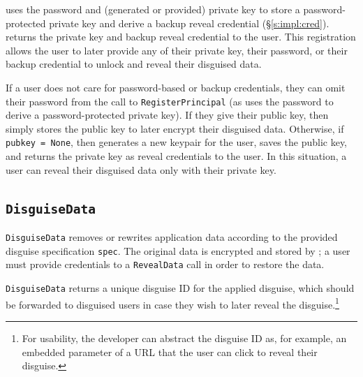     \sys uses the password and (generated or provided) private key to store a
    password-pro\-tected private key and derive a backup reveal credential
    (\S\ref{s:impl:cred}). \sys returns the private key and backup reveal
    credential to the user. This registration allows the user to later provide
    any of their private key, their password, or their backup credential to
    unlock and reveal their disguised data.

    If a user does not care for password-based or backup credentials, they can
    omit their password from the call to \texttt{RegisterPrincipal} (as \sys
    uses the password to derive a password-protected private key).  If they give
    \sys their public key, then \sys simply stores the public key to later
    encrypt their disguised data. Otherwise, if \texttt{pubkey = None}, then
    \sys generates a new keypair for the user, saves the public key, and returns
    the private key as reveal credentials to the user.  In this situation, a
    user can reveal their disguised data only with their private key.
        
\subsection{\texttt{DisguiseData}}
    \texttt{DisguiseData} removes or rewrites application data according to the
    provided disguise specification \texttt{spec}. The original data is
    encrypted and stored by \sys; a user must provide credentials to a
    \texttt{RevealData} call in order to restore the data.

    \texttt{DisguiseData} returns a unique disguise ID for the applied disguise,
    which should be forwarded to disguised users in case they wish to later
    reveal the disguise.\footnote{For usability, the developer can abstract the
    disguise ID as, for example, an embedded parameter of a URL that the user
    can click to reveal their disguise.}

